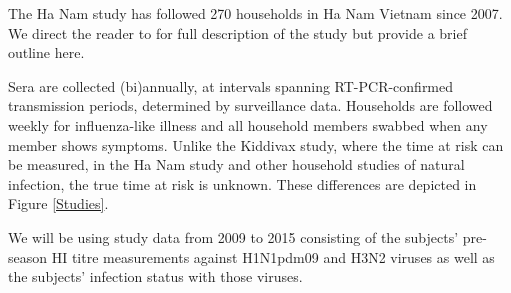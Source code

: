 The Ha Nam study has followed 270 households in Ha Nam Vietnam since 2007. We direct the reader to \cite{Horby;2012} for full description of the study but provide a brief outline here.

Sera are collected (bi)annually, at intervals spanning RT-PCR-confirmed transmission periods, determined by surveillance data. Households are followed weekly for influenza-like illness and all household members swabbed when any member shows symptoms. Unlike the Kiddivax study, where the time at risk can be measured, in the Ha Nam study and other household studies of natural infection, the true time at risk is unknown. These differences are depicted in Figure \ref{Studies}.

We will be using study data from 2009 to 2015 consisting of the subjects' pre-season HI titre measurements against H1N1pdm09 and H3N2 viruses as well as the subjects' infection status with those viruses.
